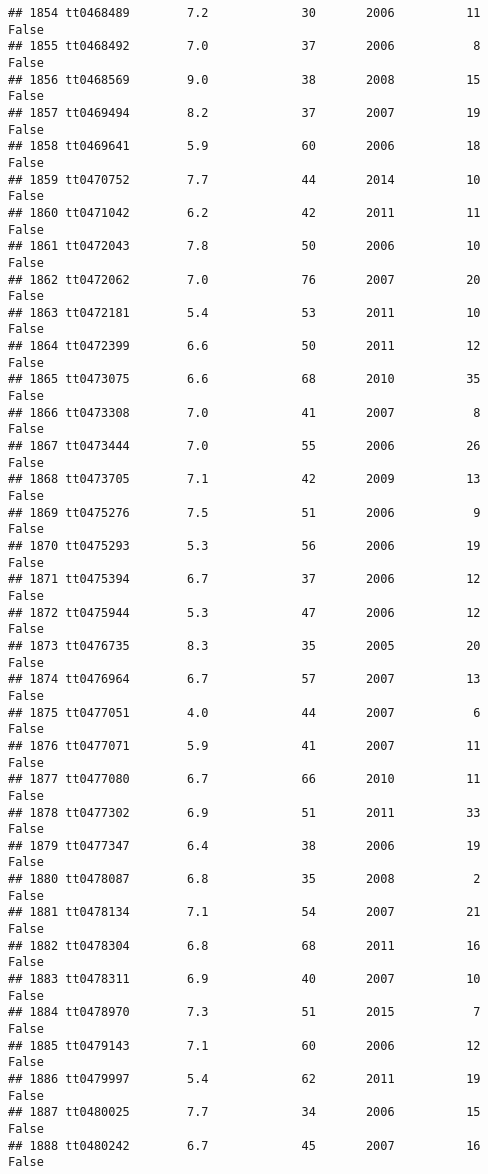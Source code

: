 \documentclass[
]{article}
\begin{document}
\begin{verbatim}
## 1854 tt0468489        7.2             30       2006          11   False
## 1855 tt0468492        7.0             37       2006           8   False
## 1856 tt0468569        9.0             38       2008          15   False
## 1857 tt0469494        8.2             37       2007          19   False
## 1858 tt0469641        5.9             60       2006          18   False
## 1859 tt0470752        7.7             44       2014          10   False
## 1860 tt0471042        6.2             42       2011          11   False
## 1861 tt0472043        7.8             50       2006          10   False
## 1862 tt0472062        7.0             76       2007          20   False
## 1863 tt0472181        5.4             53       2011          10   False
## 1864 tt0472399        6.6             50       2011          12   False
## 1865 tt0473075        6.6             68       2010          35   False
## 1866 tt0473308        7.0             41       2007           8   False
## 1867 tt0473444        7.0             55       2006          26   False
## 1868 tt0473705        7.1             42       2009          13   False
## 1869 tt0475276        7.5             51       2006           9   False
## 1870 tt0475293        5.3             56       2006          19   False
## 1871 tt0475394        6.7             37       2006          12   False
## 1872 tt0475944        5.3             47       2006          12   False
## 1873 tt0476735        8.3             35       2005          20   False
## 1874 tt0476964        6.7             57       2007          13   False
## 1875 tt0477051        4.0             44       2007           6   False
## 1876 tt0477071        5.9             41       2007          11   False
## 1877 tt0477080        6.7             66       2010          11   False
## 1878 tt0477302        6.9             51       2011          33   False
## 1879 tt0477347        6.4             38       2006          19   False
## 1880 tt0478087        6.8             35       2008           2   False
## 1881 tt0478134        7.1             54       2007          21   False
## 1882 tt0478304        6.8             68       2011          16   False
## 1883 tt0478311        6.9             40       2007          10   False
## 1884 tt0478970        7.3             51       2015           7   False
## 1885 tt0479143        7.1             60       2006          12   False
## 1886 tt0479997        5.4             62       2011          19   False
## 1887 tt0480025        7.7             34       2006          15   False
## 1888 tt0480242        6.7             45       2007          16   False

\end{verbatim}
\end{document}
